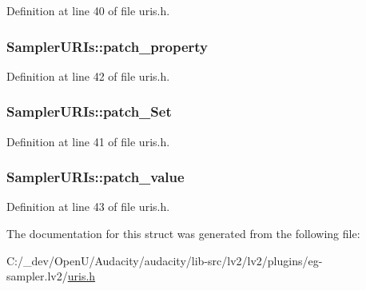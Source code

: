 Definition at line 40 of file uris.\+h.

\subsubsection[{\texorpdfstring{patch\+\_\+property}{patch_property}}]{ Sampler\+U\+R\+Is\+::patch\+\_\+property}\hypertarget{struct_sampler_u_r_is_a3b6dd165b43fec7dda85edb8f8acca13}{}\label{struct_sampler_u_r_is_a3b6dd165b43fec7dda85edb8f8acca13}


Definition at line 42 of file uris.\+h.

\subsubsection[{\texorpdfstring{patch\+\_\+\+Set}{patch_Set}}]{ Sampler\+U\+R\+Is\+::patch\+\_\+\+Set}\hypertarget{struct_sampler_u_r_is_aff70adc237ca659ac03facb7bf9cd728}{}\label{struct_sampler_u_r_is_aff70adc237ca659ac03facb7bf9cd728}


Definition at line 41 of file uris.\+h.

\subsubsection[{\texorpdfstring{patch\+\_\+value}{patch_value}}]{ Sampler\+U\+R\+Is\+::patch\+\_\+value}\hypertarget{struct_sampler_u_r_is_a143182ea5b6247aa88eb051382745673}{}\label{struct_sampler_u_r_is_a143182ea5b6247aa88eb051382745673}


Definition at line 43 of file uris.\+h.



The documentation for this struct was generated from the following file\+:\begin{DoxyCompactItemize}
\item 
C\+:/\+\_\+dev/\+Open\+U/\+Audacity/audacity/lib-\/src/lv2/lv2/plugins/eg-\/sampler.\+lv2/\hyperlink{eg-sampler_8lv2_2uris_8h}{uris.\+h}\end{DoxyCompactItemize}

